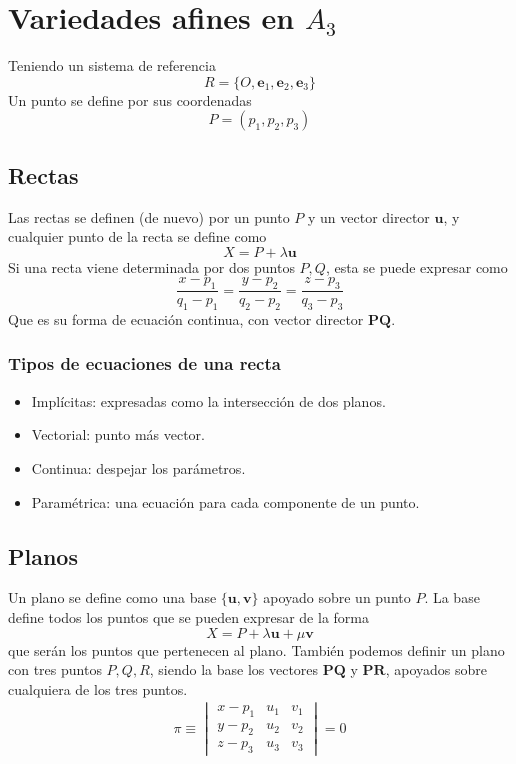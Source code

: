 \documentclass{./Geometria.tex}
\begin{document}
\section{Variedades afines en $A_{3}$ }
Teniendo un sistema de referencia
\[
	R = \{ O, \mathbf{e}_{1}, \mathbf{e}_{2}, \mathbf{e}_{3} \}
\]
Un punto se define por sus coordenadas
\[
	P=(p_1,p_2,p_3)
\]
\subsection{Rectas}
Las rectas se definen (de nuevo) por un punto $P$ y un vector director $\mathbf{u}$, y cualquier punto de la recta se define como
\[
	X = P +\lambda \mathbf{u}
\]
Si una recta viene determinada por dos puntos $P,Q$, esta se puede expresar como
\[
	\frac{x-p_1}{q_1-p_1} = \frac{y-p_2}{q_2-p_2}= \frac{z-p_3}{q_3-p_3}
\]
Que es su forma de ecuación continua, con vector director $\mathbf{PQ}$.\\
\subsubsection{Tipos de ecuaciones de una recta}
\begin{itemize}
	\item Implícitas: expresadas como la intersección de dos planos.
	\item Vectorial: punto más vector.
	\item Continua: despejar los parámetros.
	\item Paramétrica: una ecuación para cada componente de un punto.
\end{itemize}
\subsection{Planos}
Un plano se define como una base $\{ \mathbf{u}, \mathbf{v} \}$ apoyado sobre un punto $P$. La base define todos los puntos que se pueden expresar de la forma
\[
	X = P + \lambda \mathbf{u} + \mu \mathbf{v}
\]
que serán los puntos que pertenecen al plano. También podemos definir un plano con tres puntos $P,Q,R$, siendo la base los vectores $\mathbf{PQ}$ y $\mathbf{PR}$, apoyados sobre cualquiera de los tres puntos.
\begin{equation}
	\begin{split}	
	\pi \equiv \begin{vmatrix}
		x-p_1 & u_1 & v_1 \\
		y - p_2 & u_2 & v_2 \\
		z - p_3 & u_3 & v_3
	\end{vmatrix} = 0
	\end{split}
\end{equation}
\end{document}
